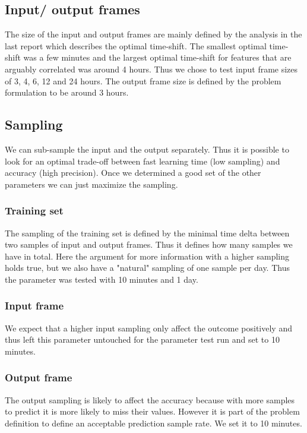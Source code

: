 \documentclass{scrartcl}
\begin{document}
\subsection{Input/ output frames}
\label{sec_3:}
The size of the input and output frames are mainly defined by the analysis in the last report which describes the optimal time-shift. The smallest optimal time-shift was a few minutes and the largest optimal time-shift for features that are arguably correlated was around 4 hours. Thus we chose to test input frame sizes of 3, 4, 6, 12 and 24 hours. The output frame size is defined by the problem formulation to be around 3 hours. 

\subsection{Sampling}
\label{sec_4:}
We can sub-sample the input and the output separately. Thus it is possible to look for an optimal trade-off between fast learning time (low sampling) and accuracy (high precision). Once we determined a good set of the other parameters we can just maximize the sampling.

\subsubsection{Training set}
\label{sec_5:}
The sampling of the training set is defined by the minimal time delta between two samples of input and output frames. Thus it defines how many samples we have in total. Here the argument for more information with a higher sampling holds true, but we also have a "natural" sampling of one sample per day. Thus the parameter was tested with 10 minutes and 1 day.

\subsubsection{Input frame}
\label{sec_7:}
We expect that a higher input sampling only affect the outcome positively and thus left this parameter untouched for the parameter test run and set to 10 minutes.

\subsubsection{Output frame}
\label{sec_8:}
The output sampling is likely to affect the accuracy because with more samples to predict it is more likely to miss their values. However it is part of the problem definition to define an acceptable prediction sample rate. We set it to 10 minutes.
\end{document}
